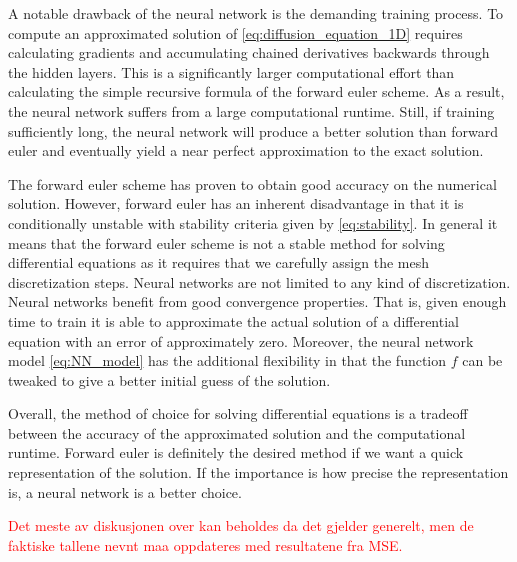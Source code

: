 \documentclass[12pt]{extarticle}
\begin{document}
\par A notable drawback of the neural network is the demanding training process. To compute an approximated solution of \eqref{eq:diffusion_equation_1D} requires calculating gradients and accumulating chained derivatives backwards through the hidden layers. This is a significantly larger computational effort than calculating the simple recursive formula of the forward euler scheme. As a result, the neural network suffers from a large computational runtime. Still, if training sufficiently long, the neural network will produce a better solution than forward euler and eventually yield a near perfect approximation to the exact solution. 

\par The forward euler scheme has proven to obtain good accuracy on the numerical solution. However, forward euler has an inherent disadvantage in that it is conditionally unstable with stability criteria given by \eqref{eq:stability}. In general it means that the forward euler scheme is not a stable method for solving differential equations as it requires that we carefully assign the mesh discretization steps. Neural networks are not limited to any kind of discretization. Neural networks benefit from good convergence properties. That is, given enough time to train it is able to approximate the actual solution of a differential equation with an error of approximately zero. Moreover, the neural network model \eqref{eq:NN_model} has the additional flexibility in that the function $f$ can be tweaked to give a better initial guess of the solution. 
\par Overall, the method of choice for solving differential equations is a tradeoff between the accuracy of the approximated solution and the computational runtime. Forward euler is definitely the desired method if we want a quick representation of the solution. If the importance is how precise the representation is, a neural network is a better choice.

\textcolor{red}{Det meste av diskusjonen over kan beholdes da det gjelder generelt, men de faktiske tallene nevnt maa oppdateres med resultatene fra MSE.}
\end{document}
